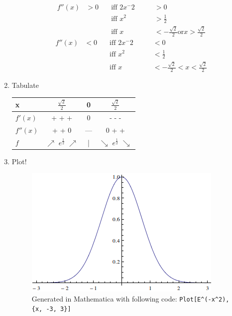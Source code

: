 \begin{enumerate}
  \begin{align}
    f''(x) & > 0 & \quad \text{iff } 2x^-2 \quad & \quad > 0 \\
           &     & \quad \text{iff } x^2   \quad & \quad > \frac{1}{2} \\
           &     & \quad \text{iff } x     \quad & \quad < -\frac{\sqrt{2}}{2}
                                            \text{or} x > \frac{\sqrt{2}}{2}
  \end{align}
  \begin{align}
    f''(x) & < 0 & \quad \text{iff } 2x^-2 \quad & \quad < 0 \\
           &     & \quad \text{iff } x^2   \quad & \quad < \frac{1}{2} \\
           &     & \quad \text{iff } x     \quad & \quad < -\frac{\sqrt{2}}{2}
                                            < x < \frac{\sqrt{2}}{2}
  \end{align}
  \item Tabulate

  \begin{tabular}{ l | c c c }
    x        & $\frac{\sqrt{2}}{2}$ & 0   & $\frac{\sqrt{2}}{2}$ \\
    \hline
    $f'(x)$  & + + +                & 0   & - - - \\
    $f''(x)$ & + + 0                & --- & 0 + + \\
    \hline \hline
    $f$      & $\nearrow$ $e^{\frac{1}{2}}$ $\nearrow$ & | & $\searrow$ $e^{\frac{1}{2}}$ $\searrow$ \\
  \end{tabular}
  \item Plot!
  \begin{figure}[!htb]
    \includegraphics{img/bellcurve.png}
    \caption{Generated in Mathematica with following code:
      \texttt{Plot[E\^{}(-x\^{}2), \{x, -3, 3\}]}}
  \end{figure}
\end{enumerate}
